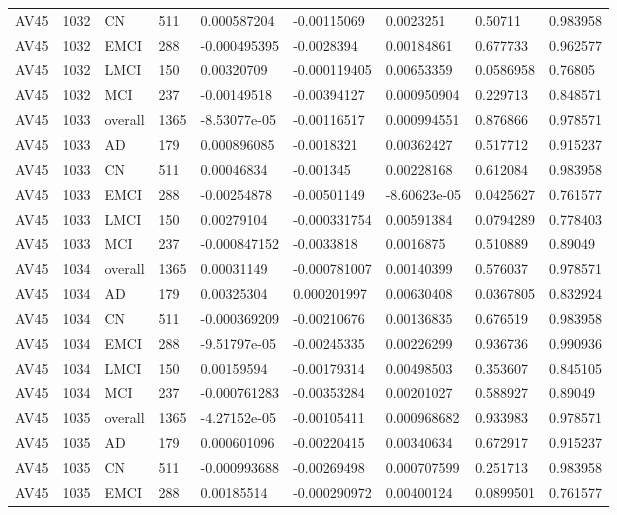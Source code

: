 \begin{landscape}
\begin{longtable}{lllllllll}
AV45 & 1032 & CN & 511 & 0.000587204 & -0.00115069 & 0.0023251 & 0.50711 & 0.983958 \\
AV45 & 1032 & EMCI & 288 & -0.000495395 & -0.0028394 & 0.00184861 & 0.677733 & 0.962577 \\
AV45 & 1032 & LMCI & 150 & 0.00320709 & -0.000119405 & 0.00653359 & 0.0586958 & 0.76805 \\
AV45 & 1032 & MCI & 237 & -0.00149518 & -0.00394127 & 0.000950904 & 0.229713 & 0.848571 \\
AV45 & 1033 & overall & 1365 & -8.53077e-05 & -0.00116517 & 0.000994551 & 0.876866 & 0.978571 \\
AV45 & 1033 & AD & 179 & 0.000896085 & -0.0018321 & 0.00362427 & 0.517712 & 0.915237 \\
AV45 & 1033 & CN & 511 & 0.00046834 & -0.001345 & 0.00228168 & 0.612084 & 0.983958 \\
AV45 & 1033 & EMCI & 288 & -0.00254878 & -0.00501149 & -8.60623e-05 & 0.0425627 & 0.761577 \\
AV45 & 1033 & LMCI & 150 & 0.00279104 & -0.000331754 & 0.00591384 & 0.0794289 & 0.778403 \\
AV45 & 1033 & MCI & 237 & -0.000847152 & -0.0033818 & 0.0016875 & 0.510889 & 0.89049 \\
AV45 & 1034 & overall & 1365 & 0.00031149 & -0.000781007 & 0.00140399 & 0.576037 & 0.978571 \\
AV45 & 1034 & AD & 179 & 0.00325304 & 0.000201997 & 0.00630408 & 0.0367805 & 0.832924 \\
AV45 & 1034 & CN & 511 & -0.000369209 & -0.00210676 & 0.00136835 & 0.676519 & 0.983958 \\
AV45 & 1034 & EMCI & 288 & -9.51797e-05 & -0.00245335 & 0.00226299 & 0.936736 & 0.990936 \\
AV45 & 1034 & LMCI & 150 & 0.00159594 & -0.00179314 & 0.00498503 & 0.353607 & 0.845105 \\
AV45 & 1034 & MCI & 237 & -0.000761283 & -0.00353284 & 0.00201027 & 0.588927 & 0.89049 \\
AV45 & 1035 & overall & 1365 & -4.27152e-05 & -0.00105411 & 0.000968682 & 0.933983 & 0.978571 \\
AV45 & 1035 & AD & 179 & 0.000601096 & -0.00220415 & 0.00340634 & 0.672917 & 0.915237 \\
AV45 & 1035 & CN & 511 & -0.000993688 & -0.00269498 & 0.000707599 & 0.251713 & 0.983958 \\
AV45 & 1035 & EMCI & 288 & 0.00185514 & -0.000290972 & 0.00400124 & 0.0899501 & 0.761577 \\

\end{longtable}
\end{landscape}
